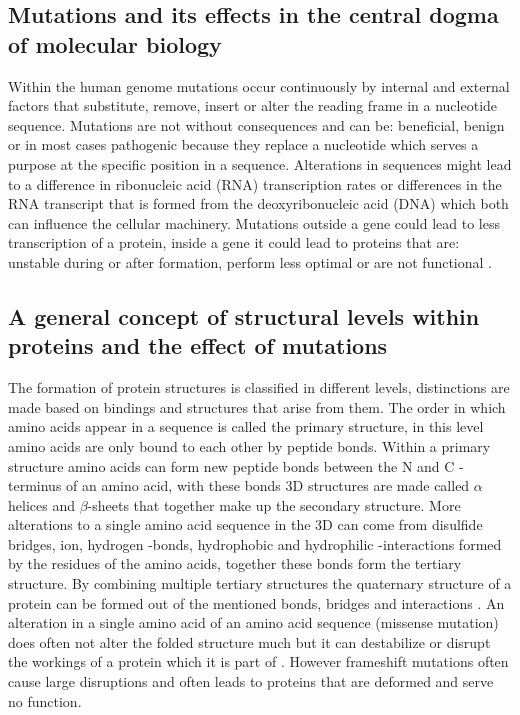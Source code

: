 \subsection{Mutations and its effects in the central dogma of molecular biology}
Within the human genome mutations occur continuously by internal and external factors that substitute, remove, insert or alter the reading frame in a nucleotide sequence. Mutations are not without consequences and can be: beneficial, benign or in most cases pathogenic because they replace a nucleotide which serves a purpose at the specific position in a sequence. Alterations in sequences might lead to a difference in ribonucleic acid (RNA) transcription rates or differences in the RNA transcript that is formed from the deoxyribonucleic acid (DNA) which both can influence the cellular machinery. Mutations outside a gene could lead to less transcription of a protein, inside a gene it could lead to proteins that are: unstable during or after formation, perform less optimal or are not functional \cite{}.

\subsection{A general concept of structural levels within proteins and the effect of mutations}
The formation of protein structures is classified in different levels, distinctions are made based on bindings and structures that arise from them. 
The order in which amino acids appear in a sequence is called the primary structure, in this level amino acids are only bound to each other by peptide bonds. 
Within a primary structure amino acids can form new peptide bonds between the N and C -terminus of an amino acid, with these bonds 3D structures are made called $\alpha$ helices and $\beta$-sheets that together make up the secondary structure.
More alterations to a single amino acid sequence in the 3D can come from disulfide bridges, ion, hydrogen -bonds, hydrophobic and hydrophilic -interactions formed by the residues of the amino acids, together these bonds form the tertiary structure.
By combining multiple tertiary structures the quaternary structure of a protein can be formed out of the mentioned bonds, bridges and interactions \cite{}.
An alteration in a single amino acid of an amino acid sequence (missense mutation) does often not alter the folded structure much but it can destabilize or disrupt the workings of a protein which it is part of \cite{}. However frameshift mutations often cause large disruptions and often leads to proteins that are deformed and serve no function.


